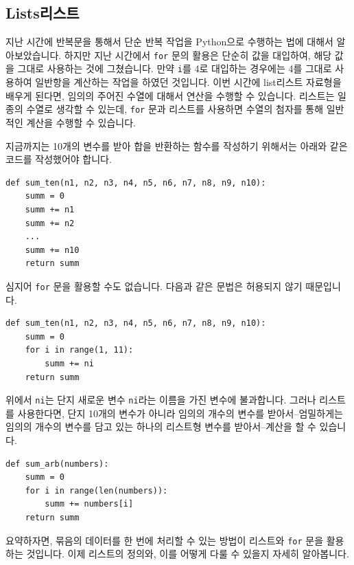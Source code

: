 \documentclass[../main.tex]{subfiles}
\begin{document}
\subsection{Lists리스트}
지난 시간에 반복문을 통해서 단순 반복 작업을 Python으로 수행하는 법에 대해서 알아보았습니다.
하지만 지난 시간에서 \texttt{for} 문의 활용은 단순히 값을 대입하여, 해당 값을 그대로 사용하는 것에 그쳤습니다.
만약 \texttt{i}를 4로 대입하는 경우에는 4를 그대로 사용하여 일반항을 계산하는 작업을 하였던 것입니다.
이번 시간에 list리스트 자료형을 배우게 된다면, 임의의 주어진 수열에 대해서 연산을 수행할 수 있습니다.
리스트는 일종의 수열로 생각할 수 있는데, \texttt{for} 문과 리스트를 사용하면 수열의 첨자를 통해 일반적인 계산을 수행할 수 있습니다.

지금까지는 10개의 변수를 받아 합을 반환하는 함수를 작성하기 위해서는 아래와 같은 코드를 작성했어야 합니다.
\begin{verbatim}
def sum_ten(n1, n2, n3, n4, n5, n6, n7, n8, n9, n10):
	summ = 0
	summ += n1
	summ += n2
	...
	summ += n10
	return summ
\end{verbatim}
심지어 \texttt{for} 문을 활용할 수도 없습니다.
다음과 같은 문법은 허용되지 않기 때문입니다.
\begin{verbatim}
def sum_ten(n1, n2, n3, n4, n5, n6, n7, n8, n9, n10):
	summ = 0
	for i in range(1, 11):
		summ += ni
	return summ
\end{verbatim}
위에서 \texttt{ni}는 단지 새로운 변수 \texttt{ni}라는 이름을 가진 변수에 불과합니다.
그러나 리스트를 사용한다면, 단지 10개의 변수가 아니라 임의의 개수의 변수를 받아서--엄밀하게는 임의의 개수의 변수를 담고 있는 하나의 리스트형 변수를 받아서--계산을 할 수 있습니다.
\begin{verbatim}
def sum_arb(numbers):
	summ = 0
	for i in range(len(numbers)):
		summ += numbers[i]
	return summ
\end{verbatim}

요약하자면, 묶음의 데이터를 한 번에 처리할 수 있는 방법이 리스트와 \texttt{for} 문을 활용하는 것입니다.
이제 리스트의 정의와, 이를 어떻게 다룰 수 있을지 자세히 알아봅니다.
\end{document}
